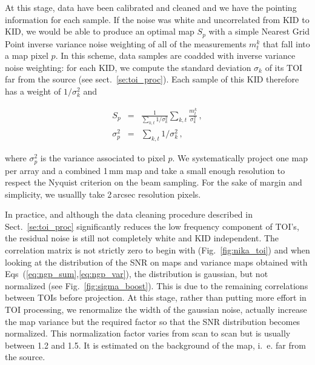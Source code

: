 At this stage, data have been calibrated and cleaned and we have the pointing
information for each sample. If the noise was white and uncorrelated from KID to
KID, we would be able to produce an optimal map $S_p$ with a simple Nearest Grid
Point inverse variance noise weighting of all of the measurements $m^k_t$ that
fall into a map pixel $p$. In this scheme, data samples are coadded with inverse
variance noise weighting: for each KID, we compute the standard deviation
$\sigma_k$ of its TOI far from the source (see sect.~\ref{se:toi_proc}). Each
sample of this KID therefore has a weight of $1/\sigma_k^2$ and

\begin{eqnarray}
S_p        &=& \frac{1}{\sum_{k,t}1/\sigma_k^2}\sum_{k,t} \frac{m^k_t}{\sigma_k^2}\,, \label{eq:ngp_sum}\\
\sigma^2_p &=& \sum_{k,t}1/\sigma_k^2\,, \label{eq:ngp_var}
\end{eqnarray}

where $\sigma^2_p$ is the variance associated to pixel $p$. We systematically
project one map per array and a combined 1\,mm map and take a small enough
resolution to respect the Nyquist criterion on the beam sampling. For the sake
of margin and simplicity, we usuallly take 2\,arcsec resolution pixels.

In practice, and although the data cleaning procedure described in
Sect.~\ref{se:toi_proc} significantly reduces the low frequency component of
TOI's, the residual noise is still not completely white and KID independent. The
correlation matrix is not strictly zero to begin with (Fig.~\ref{fig:nika_toi})
and when looking at the distribution of the SNR on maps and variance maps
obtained with Eqs~(\ref{eq:ngp_sum},\ref{eq:ngp_var}), the distribution is
gaussian, but not normalized (see Fig.~\ref{fig:sigma_boost}). This is due to the
remaining correlations between TOIs before projection. At this stage,
rather than putting more effort in TOI processing, we renormalize the width of
the gaussian noise, actually increase the map variance but the required factor
so that the SNR distribution becomes normalized. This normalization factor
varies from scan to scan but is usually between 1.2 and 1.5. It is estimated on
the background of the map, i.~e. far from the source.

